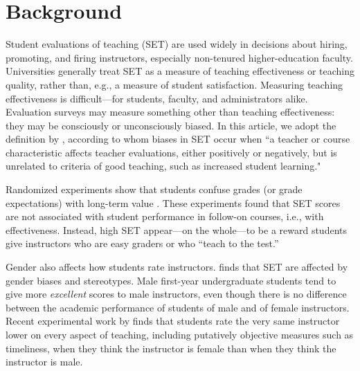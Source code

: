 \documentclass[12pt]{article}
\begin{document}
\begin{quotation}
\begin{abstract}
%

\end{abstract}

\newpage

\end{quotation}

\section{Background}
Student evaluations of teaching (SET) are used widely 
in decisions about hiring, promoting, and firing instructors, especially non-tenured 
higher-education faculty. 
Universities generally treat SET as a measure of teaching effectiveness or teaching quality, 
rather than, e.g., a measure of student satisfaction.
Measuring teaching effectiveness is difficult---for students,
faculty, and administrators alike.
Evaluation surveys may measure something other than teaching effectiveness:
they may be consciously or unconsciously biased. 
In this article, we adopt the definition by \citet[p.17]{Centra2000}, according to whom 
biases in SET occur when ``a teacher
or course characteristic affects teacher evaluations, either positively or
negatively, but is unrelated to criteria of good teaching, such as increased student learning." 

Randomized experiments show that students confuse grades 
(or grade expectations) with long-term value \citep{Carrell2010a,Braga2014}. 
These experiments found that SET scores are not associated with 
student performance in follow-on courses, i.e., with effectiveness. 
Instead, high SET appear---on the whole---to be a reward students give 
instructors who are easy graders or who ``teach to the test.''  

Gender also affects how students rate instructors.
\citet{Boring2015} finds that SET are affected by gender biases and stereotypes. 
Male first-year undergraduate students tend to give more \textit{excellent} scores to male instructors,
even though there is no difference between
the academic performance of students of male and of female instructors.
Recent experimental work by \citet{MacNell2014} finds that
students rate the very same instructor lower on every aspect of teaching,
including putatively objective measures such as timeliness, when they think the instructor is 
female than when they think the instructor is male. 
\end{document}
